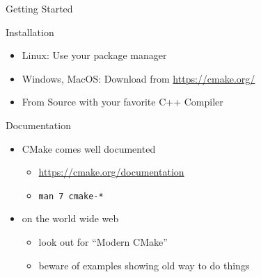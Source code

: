 \documentclass{beamer}
\begin{document}
\begin{frame}{Getting Started}
    \begin{block}{Installation}
        \begin{itemize}
            \item Linux: Use your package manager
            \item Windows, MacOS: Download from \url{https://cmake.org/}
            \item From Source with your favorite C++ Compiler
        \end{itemize}
    \end{block}
    \pause
    \begin{block}{Documentation}
        \begin{itemize}
            \item CMake comes well documented
                \begin{itemize}
                    \item \url{https://cmake.org/documentation}
                    \item \texttt{man 7 cmake-*}
                \end{itemize}
            \item on the world wide web
                \begin{itemize}
                    \item look out for \enquote{Modern CMake}
                    \item beware of examples showing old way to do things
                \end{itemize}
        \end{itemize}
    \end{block}
\end{frame}
\end{document}
